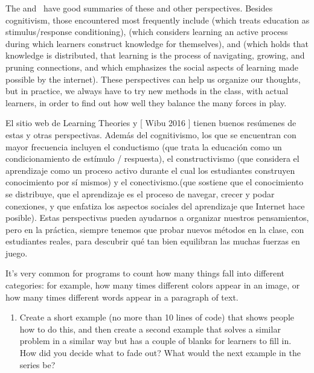 {The 
and~\cite{Wibu2016}
have good summaries of these and other perspectives.
Besides cognitivism,
those encountered most frequently include 
(which treats education as stimulus/response conditioning),
(which considers learning an active process during which learners construct knowledge for themselves),
and 
(which holds that knowledge is distributed,
that learning is the process of navigating, growing, and pruning connections,
and which emphasizes the social aspects of learning made possible by the internet).
These perspectives can help us organize our thoughts,
but in practice,
we always have to try new methods in the class,
with actual learners,
in order to find out how well they balance the many forces in play.

El sitio web de Learning Theories y [ Wibu 2016 ] tienen buenos resúmenes de estas y otras perspectivas. Además del cognitivismo, los que se encuentran con mayor frecuencia incluyen el conductismo (que trata la educación como un condicionamiento de estímulo / respuesta), el constructivismo (que considera el aprendizaje como un proceso activo durante el cual los estudiantes construyen conocimiento por sí mismos) y el conectivismo.(que sostiene que el conocimiento se distribuye, que el aprendizaje es el proceso de navegar, crecer y podar conexiones, y que enfatiza los aspectos sociales del aprendizaje que Internet hace posible). Estas perspectivas pueden ayudarnos a organizar nuestros pensamientos, pero en la práctica, siempre tenemos que probar nuevos métodos en la clase, con estudiantes reales, para descubrir qué tan bien equilibran las muchas fuerzas en juego.



It's very common for programs to count how many things fall into different categories:
for example,
how many times different colors appear in an image,
or how many times different words appear in a paragraph of text.

\begin{enumerate}
\item
  Create a short example (no more than 10 lines of code) that shows people how to do this,
  and then create a second example that solves a similar problem in a similar way
  but has a couple of blanks for learners to fill in.
  How did you decide what to fade out?
  What would the next example in the series be?


\end{enumerate}}
